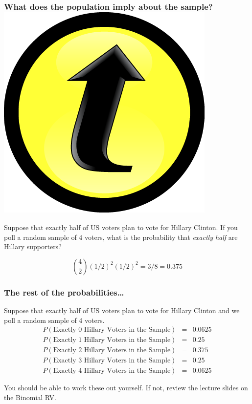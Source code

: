 \documentclass[handout]{beamer}
\begin{document}
\begin{frame}
  \frametitle{What does the population imply about the sample? \hfill\includegraphics[scale = 0.05]{./images/clicker}}
Suppose that exactly half of US voters plan to vote for Hillary Clinton. 
If you poll a random sample of 4 voters, what is the probability that \emph{exactly half} are Hillary supporters? 

\pause

\alert{$${4 \choose 2} \left( 1/2 \right)^2 \left( 1/2 \right)^2 = 3/8 = 0.375$$}
\end{frame}
\begin{frame}
  \frametitle{The rest of the probabilities\dots}
  Suppose that exactly half of US voters plan to vote for Hillary Clinton and we poll a random sample of 4 voters.
  \begin{eqnarray*}
    P\left( \mbox{Exactly 0 Hillary Voters in the Sample} \right) &=& 0.0625\\
    P\left( \mbox{Exactly 1 Hillary Voters in the Sample} \right) &=& 0.25\\
    P\left( \mbox{Exactly 2 Hillary Voters in the Sample} \right) &=& 0.375\\
    P\left( \mbox{Exactly 3 Hillary Voters in the Sample} \right) &=& 0.25\\
    P\left( \mbox{Exactly 4 Hillary Voters in the Sample} \right) &=& 0.0625 
  \end{eqnarray*}

  \vspace{1em}
  \alert{You should be able to work these out yourself. If not, review the lecture slides on the Binomial RV.}
\end{frame}
\end{document}
